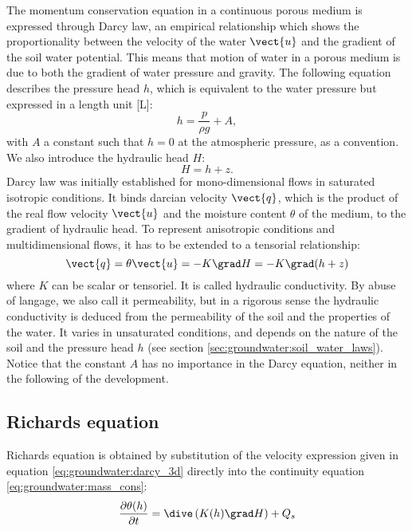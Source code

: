 The momentum conservation equation in a continuous porous medium is expressed through Darcy law,
an empirical relationship which shows the proportionality between the velocity of the water $\vect{u}$ and the gradient of the soil water potential.
This means that motion of water in a porous medium is due to both the gradient of water pressure and gravity.
The following equation describes the pressure head $h$, which is equivalent to the water pressure but expressed in a length unit [L]:
\begin{equation}
\label{eq:groundwater:definition_h}
h=\dfrac{p}{\rho g} + A,
\end{equation}
with $A$ a constant such that $h = 0$ at the atmospheric pressure, as a convention.
We also introduce the hydraulic head $H$:
\begin{equation}
\label{eq:groundwater:definition_h_2}
H = h + z.
\end{equation}
%
Darcy law was initially established for mono-dimensional flows in saturated isotropic conditions.
It binds darcian velocity $\vect{q}$, which is the product of the real flow velocity
$\vect{u}$ and the moisture content $\theta$ of the medium, to the gradient of hydraulic head.
To represent anisotropic conditions and multidimensional flows, it has to be extended to a tensorial relationship:
\begin{equation}
\label{eq:groundwater:darcy_3d}
\vect{q} = \theta \vect{ u} = -K \grad H = -K \grad (h + z)
\end{equation}
where $K$ can be scalar or tensoriel. It is called hydraulic conductivity. By abuse of langage, we also call it permeability, but in a rigorous sense the hydraulic conductivity
is deduced from the permeability of the soil and the properties of the water.
It varies in unsaturated conditions, and depends on the nature of the soil and the pressure head $h$ (see section \ref{sec:groundwater:soil_water_laws}).
Notice that the constant $A$ has no importance in the Darcy equation, neither in the following of the development.

\subsection{Richards equation}

Richards equation is obtained by substitution of the velocity expression given in equation \eqref{eq:groundwater:darcy_3d} directly into
the continuity equation \ref{eq:groundwater:mass_cons}:
\begin{equation}
\label{eq:groundwater:richards}
\frac{\partial{\theta(h)}}{\partial{t}} = \dive \left( K(h) \grad H \right) + Q_s
\end{equation}


